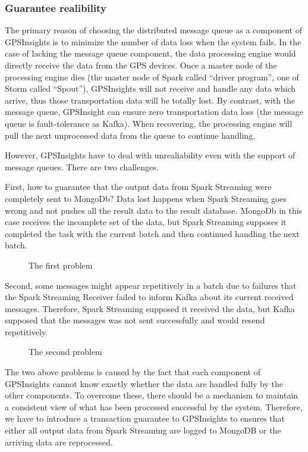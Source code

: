 \documentclass{acm_proc_article-sp}
\begin{document}
\subsubsection{Guarantee realibility}

The primary reason of choosing the distributed message queue as a component of GPSInsights is to minimize the number of data loss when the system fails. In the case of lacking the message queue component, the data processing engine would directly receive the data from the GPS devices. Once a master node of the processing engine dies (the master node of Spark called ``driver program'', one of Storm called ``Spout''), GPSInsights will not receive and handle any data which arrive, thus those transportation data will be totally lost. By contrast, with the message queue, GPSInsight can ensure zero transportation data loss (the message queue is fault-tolerance as Kafka). When recovering, the processing engine will pull the next unprocessed data from the queue to continue handling.

However, GPSInsights have to deal with unrealiability even with the support of message queues. There are two challenges. 

First, how to guarantee that the output data from Spark Streaming were completely sent to MongoDb? Data lost happens when Spark Streaming goes wrong and not pushes all the result data to the result database. MongoDb in this case receives the incomplete set of the data, but Spark Streaming supposes it completed the task with the current batch and then continued handling the next batch.

\begin{figure}[h]
\centering
{}
\caption{The first problem}
\end{figure} 

Second, some messages might appear repetitively in a batch due to failures that the Spark Streaming Receiver failed to inform Kafka about its current received messages. Therefore, Spark Streaming supposed it received the data, but Kafka supposed that the messages was not sent successfully and would resend repetitively. 
 
\begin{figure}[h]
\centering
{}
\caption{The second problem}
\end{figure} 

The two above problems is caused by the fact that each component of GPSInsights cannot know exactly whether the data are handled fully by the other components. To overcome these, there should be a mechanism to maintain a consistent view of what has been processed successful by the system. Therefore, we have to introduce a transaction guarantee to GPSInsights to ensures that either all output data from Spark Streaming are logged to MongoDB or the arriving data are reprocessed.
\end{document}
